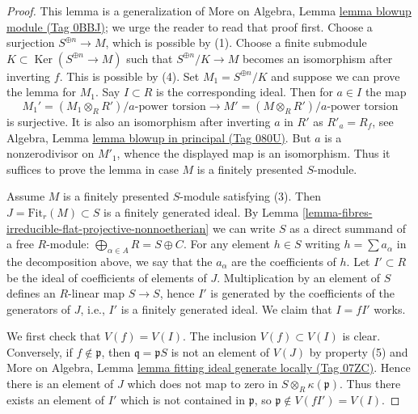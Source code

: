 \documentclass{amsart}
\theoremstyle{plain}
\theoremstyle{definition}
\theoremstyle{remark}
\numberwithin{equation}{subsection}
\def\Ker{\mathop{\mathrm{Ker}}}
\begin{document}
\begin{proof}
This lemma is a generalization of
More on Algebra, Lemma \href{https://stacks.math.columbia.edu/tag/0BBJ}{lemma blowup module (Tag 0BBJ)};
we urge the reader to read that proof first.
Choose a surjection $S^{\oplus n} \to M$, which is possible by (1).
Choose a finite submodule $K \subset \Ker(S^{\oplus n} \to M)$
such that $S^{\oplus n}/K \to M$ becomes an isomorphism after inverting $f$.
This is possible by (4). Set $M_1 = S^{\oplus n}/K$ and suppose we can
prove the lemma for $M_1$. Say $I \subset R$ is the corresponding ideal.
Then for $a \in I$ the map
$$
M_1' = (M_1 \otimes_R R')/a\text{-power torsion}
\longrightarrow
M' = (M \otimes_R R')/a\text{-power torsion}
$$
is surjective. It is also an isomorphism after inverting $a$ in $R'$
as $R'_a = R_f$, see Algebra, Lemma \href{https://stacks.math.columbia.edu/tag/080U}{lemma blowup in principal (Tag 080U)}.
But $a$ is a nonzerodivisor on $M'_1$, whence the displayed map is an
isomorphism. Thus it suffices to prove the lemma in case $M$ is a finitely
presented $S$-module.

\medskip\noindent
Assume $M$ is a finitely presented $S$-module satisfying (3).
Then $J = \text{Fit}_r(M) \subset S$ is a finitely generated ideal.
By Lemma \ref{lemma-fibres-irreducible-flat-projective-nonnoetherian}
we can write $S$ as a direct summand of a free
$R$-module: $\bigoplus_{\alpha \in A} R = S \oplus C$.
For any element $h \in S$ writing $h = \sum a_\alpha$ in the
decomposition above, we say that the $a_\alpha$ are the coefficients of $h$.
Let $I' \subset R$ be the ideal of coefficients
of elements of $J$. Multiplication by an element of $S$ defines
an $R$-linear map $S \to S$, hence $I'$ is generated by the coefficients
of the generators of $J$, i.e., $I'$ is a finitely generated ideal.
We claim that $I = fI'$ works.

\medskip\noindent
We first check that $V(f) = V(I)$. The inclusion $V(f) \subset V(I)$ is
clear. Conversely, if $f \not \in \mathfrak p$, then
$\mathfrak q =  \mathfrak p S$ is not an element of $V(J)$ by
property (5) and More on Algebra, Lemma
\href{https://stacks.math.columbia.edu/tag/07ZC}{lemma fitting ideal generate locally (Tag 07ZC)}.
Hence there is an
element of $J$ which does not map to zero in $S \otimes_R \kappa(\mathfrak p)$.
Thus there exists an element of $I'$ which is not contained in
$\mathfrak p$, so $\mathfrak p \not \in V(fI') = V(I)$.


\end{proof}
\end{document}
